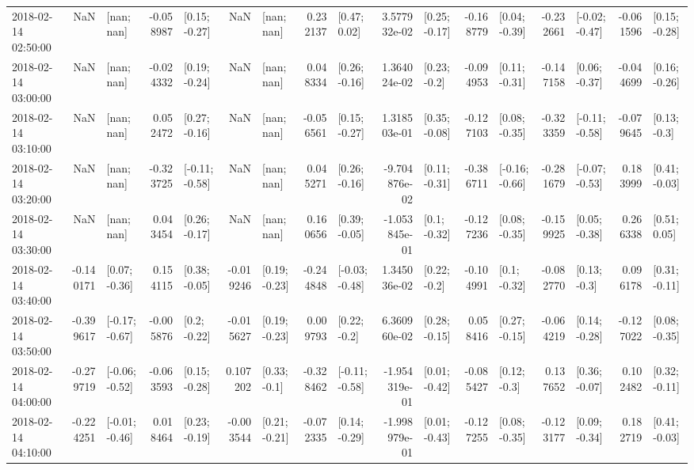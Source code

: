 \begin{tabular}{lrlrlrlrlrlrlrlrl}
2018-02-14 02:50:00 &       NaN &      [nan; nan] & -0.058987 &   [0.15; -0.27] &       NaN &      [nan; nan] &  0.232137 &    [0.47; 0.02] &  3.577932e-02 &   [0.25; -0.17] & -0.168779 &   [0.04; -0.39] & -0.232661 &  [-0.02; -0.47] & -0.061596 &   [0.15; -0.28] \\
2018-02-14 03:00:00 &       NaN &      [nan; nan] & -0.024332 &   [0.19; -0.24] &       NaN &      [nan; nan] &  0.048334 &   [0.26; -0.16] &  1.364024e-02 &    [0.23; -0.2] & -0.094953 &   [0.11; -0.31] & -0.147158 &   [0.06; -0.37] & -0.044699 &   [0.16; -0.26] \\
2018-02-14 03:10:00 &       NaN &      [nan; nan] &  0.052472 &   [0.27; -0.16] &       NaN &      [nan; nan] & -0.056561 &   [0.15; -0.27] &  1.318503e-01 &   [0.35; -0.08] & -0.127103 &   [0.08; -0.35] & -0.323359 &  [-0.11; -0.58] & -0.079645 &    [0.13; -0.3] \\
2018-02-14 03:20:00 &       NaN &      [nan; nan] & -0.323725 &  [-0.11; -0.58] &       NaN &      [nan; nan] &  0.045271 &   [0.26; -0.16] & -9.704876e-02 &   [0.11; -0.31] & -0.386711 &  [-0.16; -0.66] & -0.281679 &  [-0.07; -0.53] &  0.183999 &   [0.41; -0.03] \\
2018-02-14 03:30:00 &       NaN &      [nan; nan] &  0.043454 &   [0.26; -0.17] &       NaN &      [nan; nan] &  0.160656 &   [0.39; -0.05] & -1.053845e-01 &    [0.1; -0.32] & -0.127236 &   [0.08; -0.35] & -0.159925 &   [0.05; -0.38] &  0.266338 &    [0.51; 0.05] \\
2018-02-14 03:40:00 & -0.140171 &   [0.07; -0.36] &  0.154115 &   [0.38; -0.05] & -0.019246 &   [0.19; -0.23] & -0.244848 &  [-0.03; -0.48] &  1.345036e-02 &    [0.22; -0.2] & -0.104991 &    [0.1; -0.32] & -0.082770 &    [0.13; -0.3] &  0.096178 &   [0.31; -0.11] \\
2018-02-14 03:50:00 & -0.399617 &  [-0.17; -0.67] & -0.005876 &    [0.2; -0.22] & -0.015627 &   [0.19; -0.23] &  0.009793 &    [0.22; -0.2] &  6.360960e-02 &   [0.28; -0.15] &  0.058416 &   [0.27; -0.15] & -0.064219 &   [0.14; -0.28] & -0.127022 &   [0.08; -0.35] \\
2018-02-14 04:00:00 & -0.279719 &  [-0.06; -0.52] & -0.063593 &   [0.15; -0.28] &  0.107202 &    [0.33; -0.1] & -0.328462 &  [-0.11; -0.58] & -1.954319e-01 &   [0.01; -0.42] & -0.085427 &    [0.12; -0.3] &  0.137652 &   [0.36; -0.07] &  0.102482 &   [0.32; -0.11] \\
2018-02-14 04:10:00 & -0.224251 &  [-0.01; -0.46] &  0.018464 &   [0.23; -0.19] & -0.003544 &   [0.21; -0.21] & -0.072335 &   [0.14; -0.29] & -1.998979e-01 &   [0.01; -0.43] & -0.127255 &   [0.08; -0.35] & -0.123177 &   [0.09; -0.34] &  0.182719 &   [0.41; -0.03] \\

\end{tabular}
